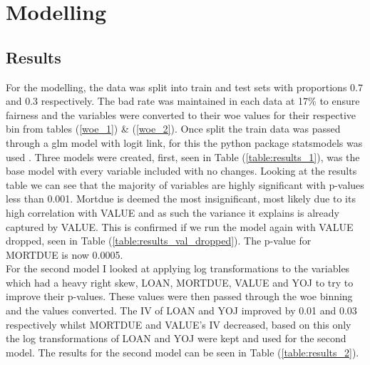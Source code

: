 \chapter{Modelling} \label{cha:chapter-3}

\section{Results}

For the modelling, the data was split into train and test sets with proportions 0.7 and 0.3 respectively. The bad rate was maintained in each data at 17\% to ensure fairness and the variables were converted to their woe values for their respective bin from tables  (\ref{woe_1}) \& (\ref{woe_2}). Once split the train data was passed through a glm model with logit link, for this the python package statsmodels was used \cite{statsmodels}. Three models were created, first, seen in Table (\ref{table:results_1}), was the base model with every variable included with no changes. Looking at the results table we can see that the majority of variables are highly significant with p-values less than 0.001. Mortdue is deemed the most insignificant, most likely due to its high correlation with VALUE and as such the variance it explains is already captured by VALUE. This is confirmed if we run the model again with VALUE dropped, seen in Table (\ref{table:results_val_dropped}). The p-value for MORTDUE is now 0.0005. \\

For the second model I looked at applying log transformations to the variables which had a heavy right skew, LOAN, MORTDUE, VALUE and YOJ to try to improve their p-values. These values were then passed through the woe binning and the values converted. The IV of LOAN and YOJ improved by 0.01 and 0.03 respectively whilst MORTDUE and VALUE's IV decreased, based on this only the log transformations of LOAN and YOJ were kept and used for the second model. The results for the second model can be seen in Table (\ref{table:results_2}). \\

